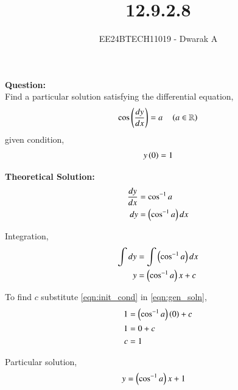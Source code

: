 \documentclass[journal]{IEEEtran}
\begin{document}

\vspace{3cm}

\title{12.9.2.8}
\author{EE24BTECH11019 - Dwarak A}
{\let\newpage\relax\maketitle}

\renewcommand{\thefigure}{\theenumi}
\renewcommand{\thetable}{\theenumi}
\setlength{\intextsep}{10pt} %


\renewcommand{\thetable}{\theenumi}

\textbf{Question:}\\
Find a particular solution satisfying the differential equation,
\begin{align}
    \cos{\ensuremath{\left(\frac{dy}{dx}\right)}} = a \quad \left(a\in\mathbb{R}\right)
\end{align}
given condition,
\begin{align}
    y\left(0\right) = 1
    \label{eqn:init_cond}
\end{align}

\solution

\medskip

\textbf{Theoretical Solution:}
\begin{align}
    \frac{dy}{dx} &= \cos^{-1}a \\
    dy &= \left(\cos^{-1}a\right)dx
\end{align}

Integration,
\begin{align}
    \int dy &= \int \left(\cos^{-1}a\right)dx \\
    y &= \left(\cos^{-1}a\right)x + c
    \label{eqn:gen_soln}
\end{align}

To find $c$ substitute \eqref{eqn:init_cond} in \eqref{eqn:gen_soln},
\begin{align}
    1 &= \left(\cos^{-1}a\right)\left(0\right) + c \\
    1 &= 0 + c \\
    c &= 1
\end{align}

Particular solution,
\begin{align}
    y &= \left(\cos^{-1}a\right)x + 1
\end{align}
\end{document}
